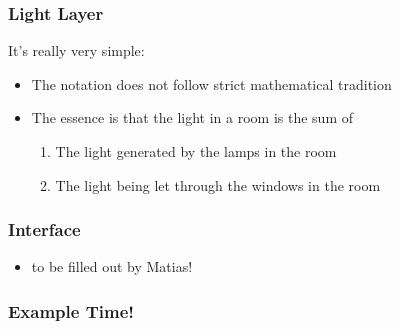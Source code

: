 \documentclass[t]{beamer}
\begin{document}
\begin{frame}
  \frametitle{Light Layer}
  
  It's really very simple:
  \begin{center}
  \end{center}
  
  \begin{itemize}
    \item The notation does not follow strict mathematical tradition
    \item The essence is that the light in a room is the sum of
    \begin{enumerate}
      \item The light generated by the lamps in the room
      \item The light being let through the windows in the room
    \end{enumerate}
  \end{itemize}
  
\end{frame}

\begin{frame}
  \frametitle{Interface}
  
  \begin{itemize}
    \item to be filled out by Matias!
  \end{itemize}
  
\end{frame}

\begin{frame}
  \frametitle{Example Time!}
  
\end{frame}
\end{document}

